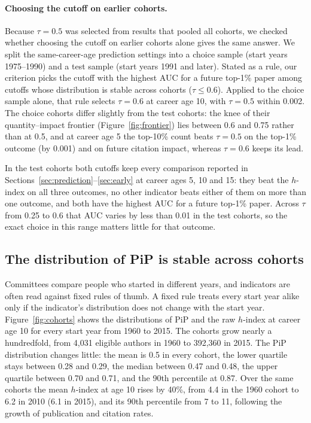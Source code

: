 \documentclass[11pt]{article}
\begin{document}
\paragraph{Choosing the cutoff on earlier cohorts.} Because $\tau = 0.5$ was selected from results that pooled all
cohorts, we checked whether choosing the cutoff on earlier cohorts alone gives the same answer. We split the
same-career-age prediction settings into a choice sample (start years 1975--1990) and a test sample (start years 1991
and later). Stated as a rule, our criterion picks the cutoff with the highest AUC for a future top-1\% paper among
cutoffs whose distribution is stable across cohorts ($\tau \le 0.6$). Applied to the choice sample alone, that rule
selects $\tau = 0.6$ at career age 10, with $\tau = 0.5$ within 0.002. The choice cohorts differ slightly from the test
cohorts: the knee of their quantity--impact frontier (Figure~\ref{fig:frontier}) lies between 0.6 and 0.75 rather than
at 0.5, and at career age 5 the top-10\% count beats $\tau = 0.5$ on the top-1\% outcome (by 0.001) and on future
citation impact, whereas $\tau = 0.6$ keeps its lead.

In the test cohorts both cutoffs keep every comparison reported in Sections~\ref{sec:prediction}--\ref{sec:early} at
career ages 5, 10 and 15: they beat the $h$-index on all three outcomes, no other indicator beats either of them on more
than one outcome, and both have the highest AUC for a future top-1\% paper. Across $\tau$ from 0.25 to 0.6 that AUC
varies by less than 0.01 in the test cohorts, so the exact choice in this range matters little for that outcome.

\subsection{The distribution of PiP is stable across cohorts}
\label{sec:cohorts}

Committees compare people who started in different years, and indicators are often read against fixed rules of thumb.
A fixed rule treats every start year alike only if the indicator's distribution does not change with the start year.
Figure~\ref{fig:cohorts} shows the distributions of PiP and the raw $h$-index at career age 10 for every start year
from 1960 to 2015. The cohorts grow nearly a hundredfold, from 4,031 eligible authors in 1960 to 392,360 in 2015. The
PiP distribution changes little: the mean is 0.5 in every cohort, the lower quartile stays between 0.28 and 0.29, the
median between 0.47 and 0.48, the upper quartile between 0.70 and 0.71, and the 90th percentile at 0.87. Over the same
cohorts the mean $h$-index at age 10 rises
by 40\%, from 4.4 in the 1960 cohort to 6.2 in 2010 (6.1 in 2015), and its 90th percentile from 7 to 11, following the
growth of publication and citation rates.
\end{document}
